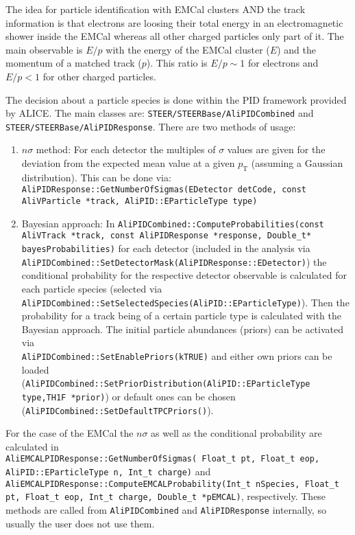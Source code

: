 The idea for particle identification with EMCal clusters AND the track information is that electrons are loosing their total energy in an electromagnetic shower inside the EMCal whereas all other charged particles only part of it. The main observable is $E/p$ with the energy of the EMCal cluster ($E$) and the momentum of a matched track ($p$). This ratio is $E/p\sim1$ for electrons and $E/p< 1$ for other charged particles. 

The decision about a particle species is done within the PID framework provided by ALICE. The main classes are: \texttt{STEER/STEERBase/AliPIDCombined} and \texttt{STEER/STEERBase/AliPIDResponse}. There are two methods of usage:
\begin{enumerate}
\item $n\sigma$ method: For each detector the multiples of $\sigma$ values are given for the deviation from the expected mean value at a given $p_{\mathrm{T}}$ (assuming a Gaussian distribution). This can be done via: \texttt{AliPIDResponse::GetNumberOfSigmas(EDetector detCode, const AliVParticle *track, AliPID::EParticleType type)}
\item Bayesian approach: In \texttt{AliPIDCombined::ComputeProbabilities(const AliVTrack *track, const AliPIDResponse *response, Double\_t* bayesProbabilities)} for each detector (included in the analysis via\\ \texttt{AliPIDCombined::SetDetectorMask(AliPIDResponse::EDetector)}) the conditional probability for the respective detector observable is calculated for each particle species (selected via\\ \texttt{AliPIDCombined::SetSelectedSpecies(AliPID::EParticleType)}). Then the probability for a track being of a certain particle type is calculated with the Bayesian approach. The initial particle abundances (priors) can be activated via\\ \texttt{AliPIDCombined::SetEnablePriors(kTRUE)} and either own priors can be loaded\\ (\texttt{AliPIDCombined::SetPriorDistribution(AliPID::EParticleType type,TH1F *prior)}) or default ones can be chosen (\texttt{AliPIDCombined::SetDefaultTPCPriors()}).
\end{enumerate}

For the case of the EMCal the $n\sigma$ as well as the conditional probability are calculated in\\ \texttt{AliEMCALPIDResponse::GetNumberOfSigmas( Float\_t pt,  Float\_t eop, AliPID::EParticleType n,  Int\_t charge)} and\\
\texttt{AliEMCALPIDResponse::ComputeEMCALProbability(Int\_t nSpecies, Float\_t pt, Float\_t eop, Int\_t charge, Double\_t *pEMCAL)}, respectively. These methods are called from \texttt{AliPIDCombined} and \texttt{AliPIDResponse} internally, so usually the user does not use them. 

